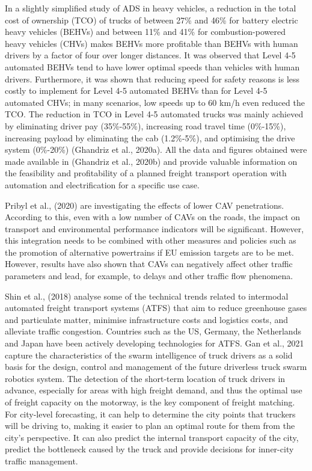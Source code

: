 \documentclass[
]{book}
\begin{document}
In a slightly simplified study of ADS in heavy vehicles, a reduction in the total cost of ownership (TCO) of trucks of between 27\% and 46\% for battery electric heavy vehicles (BEHVs) and between 11\% and 41\% for combustion-powered heavy vehicles (CHVs) makes BEHVs more profitable than BEHVs with human drivers by a factor of four over longer distances. It was observed that Level 4-5 automated BEHVs tend to have lower optimal speeds than vehicles with human drivers. Furthermore, it was shown that reducing speed for safety reasons is less costly to implement for Level 4-5 automated BEHVs than for Level 4-5 automated CHVs; in many scenarios, low speeds up to 60 km/h even reduced the TCO. The reduction in TCO in Level 4-5 automated trucks was mainly achieved by eliminating driver pay (35\%-55\%), increasing road travel time (0\%-15\%), increasing payload by eliminating the cab (1.2\%-5\%), and optimising the drive system (0\%-20\%) (Ghandriz et al., 2020a). All the data and figures obtained were made available in (Ghandriz et al., 2020b) and provide valuable information on the feasibility and profitability of a planned freight transport operation with automation and electrification for a specific use case.

Pribyl et al., (2020) are investigating the effects of lower CAV penetrations. According to this, even with a low number of CAVs on the roads, the impact on transport and environmental performance indicators will be significant. However, this integration needs to be combined with other measures and policies such as the promotion of alternative powertrains if EU emission targets are to be met. However, results have also shown that CAVs can negatively affect other traffic parameters and lead, for example, to delays and other traffic flow phenomena.

Shin et al., (2018) analyse some of the technical trends related to intermodal automated freight transport systems (ATFS) that aim to reduce greenhouse gases and particulate matter, minimise infrastructure costs and logistics costs, and alleviate traffic congestion. Countries such as the US, Germany, the Netherlands and Japan have been actively developing technologies for ATFS.
Gan et al., 2021 capture the characteristics of the swarm intelligence of truck drivers as a solid basis for the design, control and management of the future driverless truck swarm robotics system. The detection of the short-term location of truck drivers in advance, especially for areas with high freight demand, and thus the optimal use of freight capacity on the motorway, is the key component of freight matching. For city-level forecasting, it can help to determine the city points that truckers will be driving to, making it easier to plan an optimal route for them from the city's perspective. It can also predict the internal transport capacity of the city, predict the bottleneck caused by the truck and provide decisions for inner-city traffic management.
\end{document}
